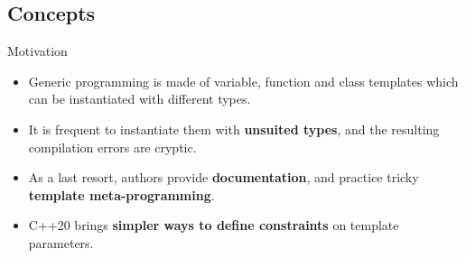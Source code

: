 \subsection[concepts]{Concepts}

\begin{frame}[fragile]
  \begin{block}{Motivation}
    \begin{itemize}
    \item Generic programming is made of variable, function and class templates which can be instantiated with different types.
    \item It is frequent to instantiate them with \textbf{unsuited types}, and the resulting compilation errors are cryptic.
    \item As a last resort, authors provide \textbf{documentation}, and practice tricky \textbf{template meta-programming}.
    \item C++20 brings \textbf{simpler ways to define constraints} on template parameters.
    \end{itemize}
  \end{block}
\end{frame}

